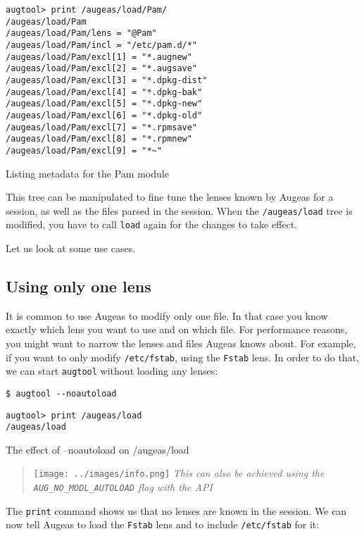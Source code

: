 \begin{listing}
  \begin{verbatim}
augtool> print /augeas/load/Pam/
/augeas/load/Pam
/augeas/load/Pam/lens = "@Pam"
/augeas/load/Pam/incl = "/etc/pam.d/*"
/augeas/load/Pam/excl[1] = "*.augnew"
/augeas/load/Pam/excl[2] = "*.augsave"
/augeas/load/Pam/excl[3] = "*.dpkg-dist"
/augeas/load/Pam/excl[4] = "*.dpkg-bak"
/augeas/load/Pam/excl[5] = "*.dpkg-new"
/augeas/load/Pam/excl[6] = "*.dpkg-old"
/augeas/load/Pam/excl[7] = "*.rpmsave"
/augeas/load/Pam/excl[8] = "*.rpmnew"
/augeas/load/Pam/excl[9] = "*~"
  \end{verbatim}
  \caption{Listing metadata for the Pam module}
  \label{lst:metadata_load_pam}
\end{listing}


This tree can be manipulated to fine tune the lenses known by Augeas for a session, as well as the files parsed in the session. When the \verb!/augeas/load! tree is modified, you have to call \verb!load! again for the changes to take effect.

Let us look at some use cases.

\subsection{Using only one lens}

It is common to use Augeas to modify only one file. In that case you know exactly which lens you want to use and on which file. For performance reasons, you might want to narrow the lenses and files Augeas knows about. For example, if you want to only modify \verb!/etc/fstab!, using the \verb!Fstab! lens. In order to do that, we can start \verb!augtool! without loading any lenses:


\begin{listing}
  \begin{verbatim}
$ augtool --noautoload
  \end{verbatim}
  \begin{verbatim}
augtool> print /augeas/load
/augeas/load
  \end{verbatim}
  \caption{The effect of --noautoload on /augeas/load}
  \label{lst:metadata_noautoload}
\end{listing}



\begin{quote}
\texttt{[image: ../images/info.png]} \emph{This can also be achieved using the \texttt{AUG\_NO\_MODL\_AUTOLOAD} flag with the API}

\end{quote}
The \verb!print! command shows us that no lenses are known in the session. We can now tell Augeas to load the \verb!Fstab! lens and to include \verb!/etc/fstab! for it:

